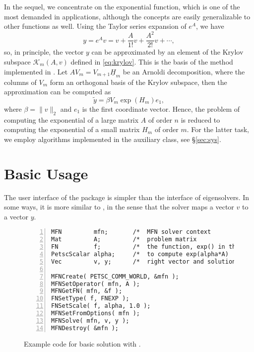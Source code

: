 In the sequel, we concentrate on the exponential function, which is one of the most demanded in applications, although the concepts are easily generalizable to other functions as well. Using the Taylor series expansion of $e^A$, we have
\begin{equation}
y=e^Av=v+\frac{A}{1!}v+\frac{A^2}{2!}v+\cdots,
\end{equation}
so, in principle, the vector $y$ can be approximated by an element of the Krylov subspace $\mathcal{K}_m(A,v)$ defined in \eqref{eq:krylov}. This is the basis of the method implemented in \expokit \citep{Sidje:1998:ESP}. Let $AV_m=V_{m+1}\underline{H}_m$ be an Arnoldi decomposition, where the columns of $V_m$ form an orthogonal basis of the Krylov subspace, then the approximation can be computed as
\begin{equation}
\tilde y=\beta V_m\exp(H_m)e_1,
\end{equation}
where $\beta=\|v\|_2$ and $e_1$ is the first coordinate vector. Hence, the problem of computing the exponential of a large matrix $A$ of order $n$ is reduced to computing the exponential of a small matrix $H_m$ of order $m$. For the latter task, we employ algorithms implemented in the  auxiliary class, see \S\ref{sec:sys}.

\section{Basic Usage}

The user interface of the  package is simpler than the interface of eigensolvers. In some ways, it is more similar to , in the sense that the solver maps a vector $v$ to a vector $y$. 

\begin{figure}
\begin{Verbatim}[fontsize=\small,numbers=left,numbersep=6pt,xleftmargin=15mm]
MFN         mfn;       /*  MFN solver context                  */
Mat         A;         /*  problem matrix                      */
FN          f;         /*  the function, exp() in this example */
PetscScalar alpha;     /*  to compute exp(alpha*A)             */
Vec         v, y;      /*  right vector and solution           */

MFNCreate( PETSC_COMM_WORLD, &mfn );
MFNSetOperator( mfn, A );
MFNGetFN( mfn, &f );
FNSetType( f, FNEXP );
FNSetScale( f, alpha, 1.0 );
MFNSetFromOptions( mfn );
MFNSolve( mfn, v, y );
MFNDestroy( &mfn );
\end{Verbatim}
\caption{\label{fig:ex-mfn}Example code for basic solution with .}
\end{figure}

